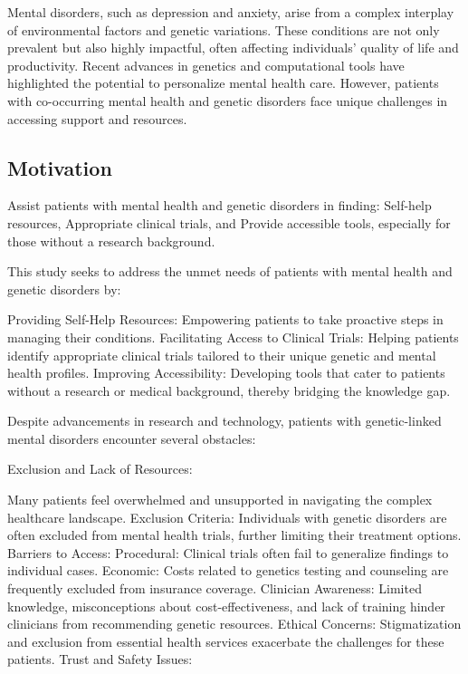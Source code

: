 \documentclass{article} %
\begin{document}
Mental disorders, such as depression and anxiety, arise from a complex interplay of environmental factors and genetic variations. These conditions are not only prevalent but also highly impactful, often affecting individuals’ quality of life and productivity. Recent advances in genetics and computational tools have highlighted the potential to personalize mental health care. However, patients with co-occurring mental health and genetic disorders face unique challenges in accessing support and resources.

\subsection{Motivation}

Assist patients with mental health and genetic disorders in finding: Self-help resources, Appropriate clinical trials, and Provide accessible tools, especially for those without a research background.

This study seeks to address the unmet needs of patients with mental health and genetic disorders by:

Providing Self-Help Resources: Empowering patients to take proactive steps in managing their conditions.
Facilitating Access to Clinical Trials: Helping patients identify appropriate clinical trials tailored to their unique genetic and mental health profiles.
Improving Accessibility: Developing tools that cater to patients without a research or medical background, thereby bridging the knowledge gap.


Despite advancements in research and technology, patients with genetic-linked mental disorders encounter several obstacles:

Exclusion and Lack of Resources:

Many patients feel overwhelmed and unsupported in navigating the complex healthcare landscape.
Exclusion Criteria: Individuals with genetic disorders are often excluded from mental health trials, further limiting their treatment options.
Barriers to Access:
Procedural: Clinical trials often fail to generalize findings to individual cases.
Economic: Costs related to genetics testing and counseling are frequently excluded from insurance coverage.
Clinician Awareness: Limited knowledge, misconceptions about cost-effectiveness, and lack of training hinder clinicians from recommending genetic resources.
Ethical Concerns: Stigmatization and exclusion from essential health services exacerbate the challenges for these patients.
Trust and Safety Issues:
\end{document}
